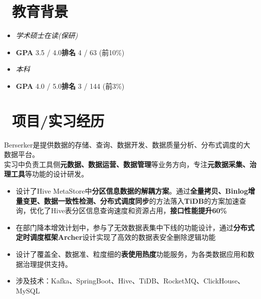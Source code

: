 \documentclass{resume}
\begin{document}


  \section{\faGraduationCap\ 教育背景}
  \begin{itemize}
    \item \textit{学术硕士在读(保研)}
    \item \textbf{GPA} 3.5 / 4.0\space \space \textbf{排名} 4 /  63 (前10\%)
  \end{itemize}
  \begin{itemize}
    \item \textit{本科}
    \item \textbf{GPA} 4.0 / 5.0\space \space \textbf{排名} 3 / 144 (前3\%)
  \end{itemize}

\section{\faUsers\ 项目/实习经历}
Berserker是提供数据的存储、查询、数据开发、数据质量分析、分布式调度的大数据平台。\\
实习中负责工具侧\textbf{元数据、数据运营、数据管理}等业务方向，专注\textbf{元数据采集、治理工具}等功能的设计研发。
\begin{itemize}
  \item 设计了Hive MetaStore中\textbf{分区信息数据的解耦方案}。通过\textbf{全量拷贝、Binlog增量变更、数据一致性检测、分布式调度同步}的方法落入\textbf{TiDB}的方案加速查询，优化了Hive表分区信息查询速度和资源占用，\textbf{接口性能提升60\%}
  \item 在部门降本增效计划中，参与了无效数据表集中下线的功能设计，通过\textbf{分布式定时调度框架Archer}设计实现了高效的数据表安全删除逻辑功能
  \item 设计了覆盖全、数据准、粒度细的\textbf{表使用热度}功能服务，为各类数据应用和数据治理提供支持。
  \item 涉及技术：Kafka、SpringBoot、Hive、TiDB、RocketMQ、ClickHouse、MySQL
\end{itemize}
\end{document}
